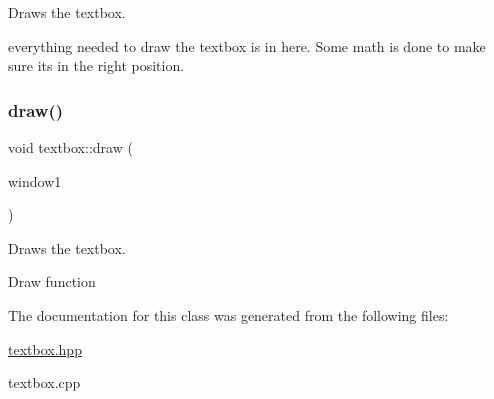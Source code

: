 Draws the textbox. 

everything needed to draw the textbox is in here. Some math is done to make sure its in the right position. \mbox{\label{classtextbox_a7fa168e1b9aedae0d7c9a74adea2137a}} 
\subsubsection{\texorpdfstring{draw()}{draw()}}
{\footnotesize\ttfamily void textbox\+::draw (\begin{DoxyParamCaption}\item[{sf\+::\+Render\+Window \&}]{window1 }\end{DoxyParamCaption})}



Draws the textbox. 

Draw function 

The documentation for this class was generated from the following files\+:\begin{DoxyCompactItemize}
\item 
\hyperlink{textbox_8hpp}{textbox.\+hpp}\item 
textbox.\+cpp\end{DoxyCompactItemize}
